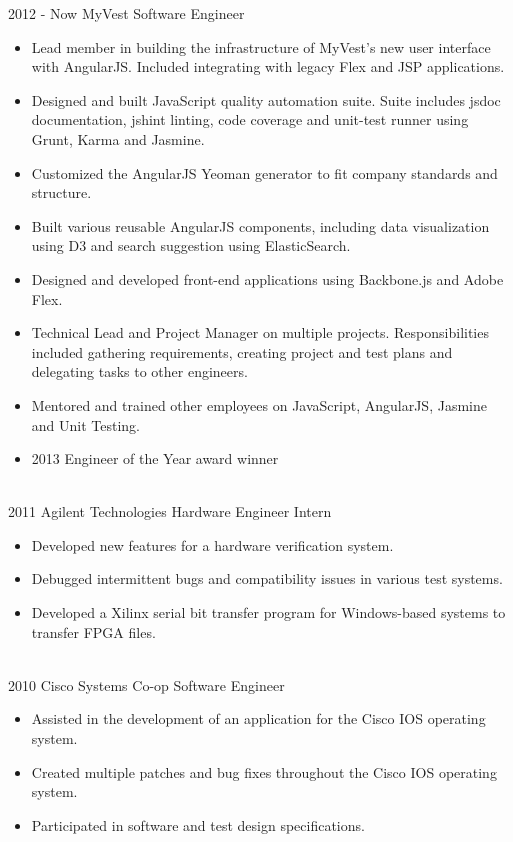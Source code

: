 \documentclass[print]{friggeri-cv}
\begin{document}
\begin{entrylist}
  \entry
    {2012 - Now}
    {MyVest}
    {Software Engineer}
    {\begin{itemize}
    \item Lead member in building the infrastructure of MyVest’s new user interface with AngularJS. Included integrating with legacy Flex and JSP applications.
    \item Designed and built JavaScript quality automation suite. Suite includes jsdoc documentation, jshint linting, code coverage and unit-test runner using Grunt, Karma and Jasmine.
    \item Customized the AngularJS Yeoman generator to fit company standards and structure.
    \item Built various reusable AngularJS components, including data visualization using D3 and search suggestion using ElasticSearch.
    \item Designed and developed front-end applications using Backbone.js and Adobe Flex.
    \item Technical Lead and Project Manager on multiple projects. Responsibilities included gathering requirements, creating project and test plans and delegating tasks to other engineers.
    \item Mentored and trained other employees on JavaScript, AngularJS, Jasmine and Unit Testing.
    \item 2013 Engineer of the Year award winner
    \end{itemize}
    }
  \\
  \entry
    {2011}
    {Agilent Technologies}
    {Hardware Engineer Intern}
    {\begin{itemize}
    \item Developed new features for a hardware verification system.
    \item Debugged intermittent bugs and compatibility issues in various test systems.
    \item Developed a Xilinx serial bit transfer program for Windows-based systems to transfer FPGA files.
    \end{itemize}
    }
  \\
  \entry
    {2010}
    {Cisco Systems}
    {Co-op Software Engineer}
    {\begin{itemize}
    \item Assisted in the development of an application for the Cisco IOS operating system.
    \item Created multiple patches and bug fixes throughout the Cisco IOS operating system.
    \item Participated in software and test design specifications.
    \end{itemize}
    }
\end{entrylist}
\end{document}
